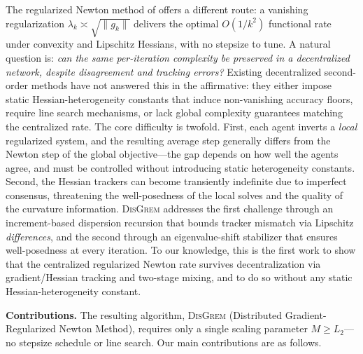 \documentclass[11pt,a4paper]{article}
\def\cO{O}%
\newcommand{\cO}{\mathcal{O}}
\begin{document}
	The regularized Newton method of \citet{mishchenko2023rn} offers a
	different route: a vanishing regularization
	$\lambda_k\asymp\sqrt{\|g_k\|}$ delivers the optimal $\cO(1/k^2)$
	functional rate under convexity and Lipschitz Hessians, with no
	stepsize to tune.
	A natural question is:
	\emph{can the same per-iteration complexity be preserved in a
	decentralized network, despite disagreement and tracking errors?}
	Existing decentralized second-order methods have not answered this
	in the affirmative: they either impose static Hessian-heterogeneity
	constants that induce non-vanishing accuracy floors, require line search
	mechanisms, or lack global complexity guarantees matching the
	centralized rate.
	The core difficulty is twofold.
	First, each agent inverts a \emph{local} regularized system, and
	the resulting average step generally differs from the Newton step
	of the global objective---the gap depends on how well the agents
	agree, and must be controlled without introducing static
	heterogeneity constants.
	Second, the Hessian trackers can become transiently indefinite
	due to imperfect consensus, threatening the well-posedness of
	the local solves and the quality of the curvature information.
	\textsc{DisGrem} addresses the first challenge through an
	increment-based dispersion recursion that bounds tracker
	mismatch via Lipschitz \emph{differences}, and the second
	through an eigenvalue-shift stabilizer that ensures
	well-posedness at every iteration.
	To our knowledge, this is the first work to show that the
	centralized regularized Newton rate survives decentralization via
	gradient/Hessian tracking and two-stage mixing, and to do so
	without any static Hessian-heterogeneity constant.
	
\noindent\textbf{Contributions.}
The resulting algorithm, \textsc{DisGrem} (Distributed
Gradient-Regularized Newton Method), requires only a single
scaling parameter $M\ge L_2$---no stepsize schedule or line
search.
Our main contributions are as follows.
\end{document}
